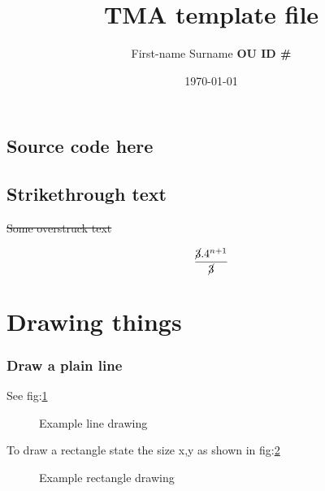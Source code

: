 \documentclass{report}
\title{\Large{\textbf{TMA template file}}}
\author{First-name Surname {\textbf{OU ID \#}}}
\date{\today}
\begin{document}
\begin{titlepage}
\maketitle
\end{titlepage}

\tableofcontents
\pagebreak


\pagestyle{fancy}
\fancyhf{}


\subsection*{Source code here}

\subsection*{Strikethrough text}

\st{Some overstruck text}

\[ \frac{\cancel{3}.4^{n+1}}{\cancel{3}}\\ \]

\section{Drawing things}

\subsubsection{Draw a plain line}
 See fig:\ref{Example line drawing}
\begin{figure}[ht]
\caption{Example line drawing}
\label{Example line drawing}
\end{figure}



To draw a rectangle state the size x,y as shown in fig:\ref{Example rectangle drawing}

\begin{figure}[ht]
\caption{Example rectangle drawing}
\label{Example rectangle drawing}
\end{figure}
\end{document}

